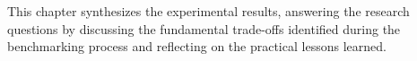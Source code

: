 This chapter synthesizes the experimental results, answering the research questions by discussing the fundamental trade-offs identified during the benchmarking process and reflecting on the practical lessons learned.